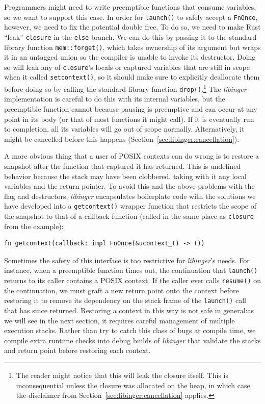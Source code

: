 Programmers might need to write preemptible functions that consume variables, so we
want to support this case.  In order for \texttt{launch()} to safely accept a
\texttt{FnOnce}, however, we need to fix the potential double free.  To do so, we
need to make Rust ``leak'' \texttt{closure} in the \texttt{else} branch.  We can do
this by passing it to the standard library function \texttt{mem::forget()}, which
takes ownership of its argument but wraps it in an untagged union so the compiler is
unable to invoke its destructor.  Doing so will leak any of \texttt{closure}'s locals
or captured variables that are still in scope when it called \texttt{setcontext()},
so it should make sure to explicitly deallocate them before doing so by calling the
standard library function \texttt{drop()}.\footnote{The reader might notice that this
will leak the closure itself.  This is inconsequential unless the closure was
allocated on the heap, in which case the disclaimer from
Section~\ref{sec:libinger:cancellation} applies.}  The \textit{libinger}
implementation is careful to do this with its internal variables, but the preemptible
function cannot because pausing is preemptive and can occur at any point in its body
(or that of most functions it might call).  If it is eventually run to completion,
all its variables will go out of scope normally.  Alternatively, it might be
cancelled before this happens (Section~\ref{sec:libinger:cancellation}).

A more obvious thing that a user of POSIX contexts can do wrong is to restore a
snapshot after the function that captured it has returned.  This is undefined
behavior because the stack may have been clobbered, taking with it any local
variables and the return pointer.  To avoid this and the above problems with the flag
and destructors, \textit{libinger} encapsulates boilerplate code with the solutions
we have developed into a \texttt{getcontext()} wrapper function that restricts the
scope of the snapshot to that of a callback function (called in the same place as
\texttt{closure} from the example):
\begin{lstlisting}[morekeywords={fn,impl,FnOnce}]
  fn getcontext(callback: impl FnOnce(&ucontext_t) -> ())
\end{lstlisting}

Sometimes the safety of this interface is too restrictive for \textit{libinger}'s
needs.  For instance, when a preemptible function times out, the continuation that
\texttt{launch()} returns to its caller contains a POSIX context.  If the caller ever
calls \texttt{resume()} on the continuation, we must graft a new return point onto
the context before restoring it to remove its dependency on the stack frame of the
\texttt{launch()} call that has since returned.  Restoring a context in this way is
not safe in general:\@ as we will see in the next section, it requires careful
management of multiple execution stacks.  Rather than try to catch this class of bugs
at compile time, we compile extra runtime checks into debug builds of
\textit{libinger} that validate the stacks and return point before restoring each
context.

